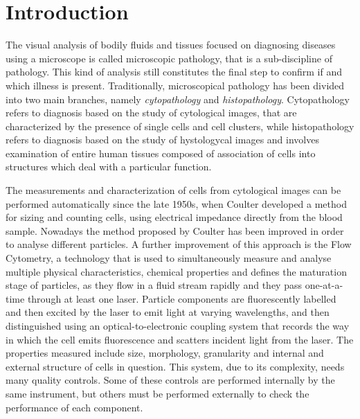 \documentclass[final,a4paper,12pt,english]{UnicaPhdThesis3}
\begin{document}
\tableofcontents

\listoffigures 

\listoftables

\newpage
\printacronyms[include-classes=abbrev, name=Acronyms]

\chapter{Introduction} %
The visual analysis of bodily fluids and tissues focused on diagnosing diseases using a microscope is called microscopic pathology, that is a sub-discipline of pathology. This kind of analysis still constitutes the final step to confirm if and which illness is present. Traditionally, microscopical pathology has been divided into two main branches, namely \textit{cytopathology} and \textit{histopathology}. Cytopathology refers to diagnosis based on the study of cytological images, that are characterized by the presence of single cells and cell clusters, while histopathology refers to diagnosis based on the study of hystologycal images and involves examination of entire human tissues composed of association of cells into structures which deal with a particular function.

The measurements and characterization of cells from cytological images can be performed automatically since the late 1950s, when Coulter \cite{Coulter} developed a method for sizing and counting cells, using electrical impedance directly from the blood sample. Nowadays the method proposed by Coulter has been improved in order to analyse different particles. A further improvement of this approach is the Flow Cytometry, a technology that is used to simultaneously measure and analyse multiple physical characteristics, chemical properties and defines the maturation stage of particles, as they flow in a fluid stream rapidly and they pass one-at-a-time through at least one laser. Particle components are fluorescently labelled and then excited by the laser to emit light at varying wavelengths, and then distinguished using an optical-to-electronic coupling system that records the way in which the cell emits fluorescence and scatters incident light from the laser. The properties measured include size, morphology, granularity and internal and external structure of cells in question. This system, due to its complexity, needs many quality controls. Some of these controls are performed internally by the same instrument, but others must be performed externally to check the performance of each component.
\end{document}
